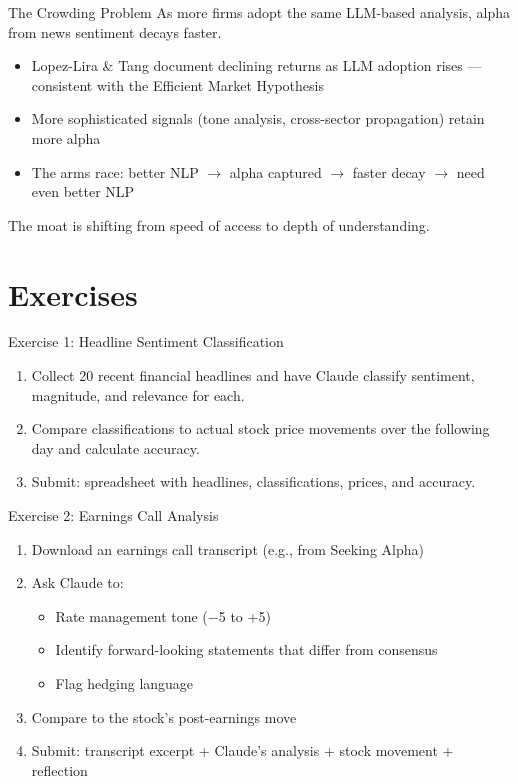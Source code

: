 \documentclass[aspectratio=169]{beamer}
\begin{document}
\begin{frame}{The Crowding Problem}
As more firms adopt the same LLM-based analysis, alpha from news sentiment decays faster.
\vspace{0.3cm}
\begin{itemize}
  \item Lopez-Lira \& Tang document declining returns as LLM adoption rises --- consistent with the Efficient Market Hypothesis
  \item More sophisticated signals (tone analysis, cross-sector propagation) retain more alpha
  \item The arms race: better NLP $\rightarrow$ alpha captured $\rightarrow$ faster decay $\rightarrow$ need even better NLP
\end{itemize}
\vspace{0.3cm}
The moat is shifting from \alert{speed of access} to \alert{depth of understanding}.
\end{frame}

\section{Exercises}

\begin{frame}{Exercise 1: Headline Sentiment Classification}
\begin{enumerate}
  \item Collect 20 recent financial headlines and have Claude classify sentiment, magnitude, and relevance for each.
  \item Compare classifications to actual stock price movements over the following day and calculate accuracy.
  \item Submit: spreadsheet with headlines, classifications, prices, and accuracy.
\end{enumerate}
\end{frame}

\begin{frame}{Exercise 2: Earnings Call Analysis}
\begin{enumerate}
  \item Download an earnings call transcript (e.g., from Seeking Alpha)
  \item Ask Claude to:
  \begin{itemize}\small
    \item Rate management tone ($-$5 to +5)
    \item Identify forward-looking statements that differ from consensus
    \item Flag hedging language
  \end{itemize}
  \item Compare to the stock's post-earnings move
  \item Submit: transcript excerpt + Claude's analysis + stock movement + reflection
\end{enumerate}
\end{frame}
\end{document}
